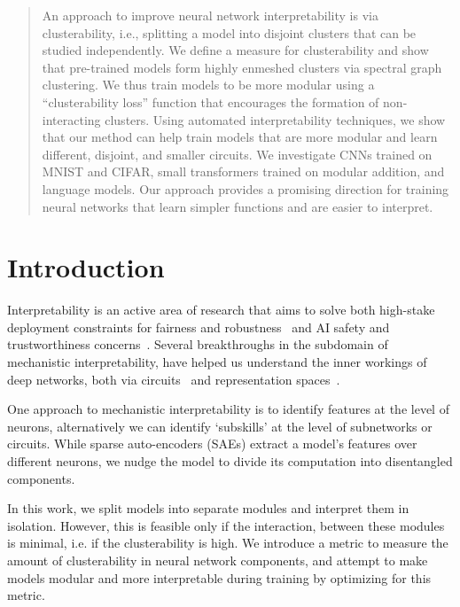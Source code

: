 \begin{abstract}

An approach to improve neural network interpretability is via clusterability, i.e., splitting a model into disjoint clusters that can be studied independently.
We define a measure for clusterability and show that pre-trained models form highly enmeshed clusters via spectral graph clustering. We thus train models to be more modular using a ``clusterability loss'' function that encourages the formation of non-interacting clusters.
Using automated interpretability techniques, we show that our method can help train models that are more modular and learn different, disjoint, and smaller circuits. We investigate CNNs trained on MNIST and CIFAR, small transformers trained on modular addition, and language models.
Our approach provides a promising direction for training neural networks that learn simpler functions and are easier to interpret.

\end{abstract}

\section{Introduction}

Interpretability is an active area of research that aims to solve both high-stake deployment constraints for fairness and robustness~\citep{McClure2020EvaluatingAR} and AI safety and trustworthiness concerns~\citep{Bereska2024MechanisticIF}. Several breakthroughs in the subdomain of mechanistic interpretability, have helped us understand the inner workings of deep networks, both via circuits~\citep{wang2022interpretability, olah2020zoom, elhage2021mathematical} and representation spaces~\citep{zou2023representation, bricken2023towards}.

One approach to mechanistic interpretability is to identify features at the level of neurons, alternatively we can identify `subskills' at the level of subnetworks or circuits.
While sparse auto-encoders (SAEs) \citep{huben2024sparse} extract a model's features over different neurons, we nudge the model to divide its computation into disentangled components.

In this work, we split models into separate modules and interpret them in isolation. However, this is feasible only if the interaction, between these modules is minimal, i.e. if the clusterability is high. We introduce a metric to measure the amount of clusterability in neural network components, and attempt to make models modular and more interpretable during training by optimizing for this metric.


